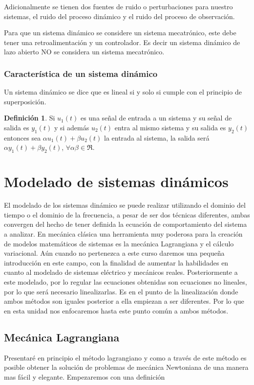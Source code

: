 \documentclass[12pt]{book}
\theoremstyle{definition}
\newtheorem{dfn}{Definición}[section]
\theoremstyle{remark}
\theoremstyle{plain}
\begin{document}
Adicionalmente se tienen dos fuentes de ruido o perturbaciones para nuestro sistemas, el ruido del proceso dinámico y el ruido del proceso de observación.

Para que un sistema dinámico se considere un sistema mecatrónico, este debe tener una retroalimentación y un controlador. Es decir un sistema dinámico de lazo abierto NO se considera un sistema mecatrónico.

\subsection{Característica de un sistema dinámico}

Un sistema dinámico se dice que es lineal si y solo si cumple con el principio de superposición.

\begin{dfn}
\label{def1}
Si $u_1(t)$ es una señal de entrada a un sistema y su señal de salida es $y_1(t)$ y si además $u_2 (t)$ entra al mismo sistema y su salida es $y_2 (t)$ entonces sea $\alpha u_1(t)+ \beta u_2 (t)$ la entrada al sistema, la salida será $\alpha y_1 (t)+ \beta y_2 (t)$, $\forall \alpha \beta \in \Re$.
\end{dfn}



\chapter{Modelado de sistemas dinámicos}
El modelado de los sistemas dinámico se puede realizar utilizando el dominio del tiempo o el dominio de la frecuencia, a pesar de ser dos técnicas diferentes, ambas convergen del hecho de tener definida la ecuación de comportamiento del sistema a analizar. En mecánica clásica una herramienta muy poderosa para la creación de modelos matemáticos de sistemas es la mecánica Lagrangiana y el cálculo variacional. Aún cuando no pertenezca a este curso daremos una pequeña introducción en este campo, con la finalidad de aumentar la habilidades en cuanto al modelado de sistemas eléctrico y mecánicos reales. Posteriormente a este modelado, por lo regular las ecuaciones obtenidas son ecuaciones no lineales, por lo que será necesario linealizarlas. Es en el punto de la linealización donde ambos métodos son iguales posterior a ella empiezan a ser diferentes. Por lo que en esta unidad nos enfocaremos hasta este punto común a ambos métodos.

\section{Mecánica Lagrangiana}
Presentaré en principio el método lagrangiano y como a través de este método es posible obtener la solución de problemas de mecánica Newtoniana de una manera mas fácil y elegante. Empezaremos con una definición
\end{document}
